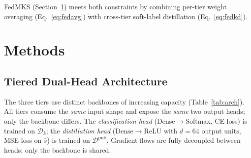 \documentclass[conference]{IEEEtran}
\begin{document}
\noindent FedMKS (Section~\ref{sec:methods}) meets both constraints by
combining per-tier weight averaging (Eq.~\ref{eq:fedavg}) with cross-tier
soft-label distillation (Eq.~\ref{eq:fedkd}).

\section{Methods}
\label{sec:methods}

\subsection{Tiered Dual-Head Architecture}

The three tiers use distinct backbones of increasing capacity
(Table~\ref{tab:arch}).  All tiers consume the \emph{same} input shape
and expose the \emph{same} two output heads; only the backbone differs.
The \emph{classification head} (Dense$\to$Softmax, CE loss) is trained on
$\mathcal{D}_k$; the \emph{distillation head} (Dense$\to$ReLU with $d{=}64$
output units, MSE loss on $\bar{s}$) is trained on $\mathcal{D}^{\text{pub}}$.
Gradient flows are fully decoupled between heads; only the backbone is shared.
\end{document}
